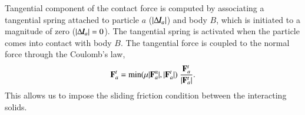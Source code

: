 Tangential component of the contact force is computed by associating a
tangential spring attached to particle $a$ ($|\Delta \textit{\textbf{l}}_a|$)
and body $B$, which is initiated to a magnitude of zero
($|\Delta \textit{\textbf{l}}_a|=0$). The tangential spring is activated when
the particle comes into contact with body $B$. The tangential force is coupled
to the normal force through the Coulomb's law,
\begin{equation}
  \label{eq:Coulomb-law}
  \mathbf{F}_{a}^{t} = \min(\mu |\mathbf{F}_{a}^{n}|, |\mathbf{F}_{a}^{t}|) \
  \frac{\mathbf{F}_{a}^{t}}{|\mathbf{F}_{a}^{t}|}.
\end{equation}
This allows us to impose the sliding friction condition between the
interacting solids.

\FloatBarrier%
